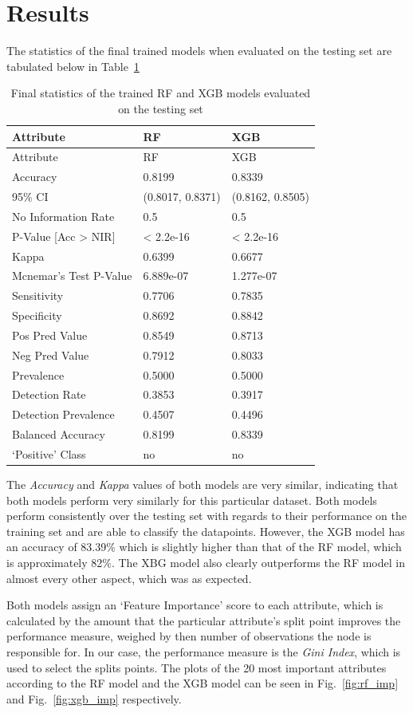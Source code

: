 \documentclass[runningheads]{llncs}
\begin{document}
\hypertarget{results}{%
\section{Results}\label{results}}

The statistics of the final trained models when evaluated on the testing
set are tabulated below in Table~\ref{tbl:model_stats}

\hypertarget{tbl:model_stats}{}
\begin{longtable}[]{@{}lll@{}}
\caption{\label{tbl:model_stats}Final statistics of the trained RF and
XGB models evaluated on the testing set}\tabularnewline
\toprule
Attribute & RF & XGB\tabularnewline
\midrule
\endfirsthead
\toprule
Attribute & RF & XGB\tabularnewline
\midrule
\endhead
Accuracy & 0.8199 & 0.8339\tabularnewline
95\% CI & (0.8017, 0.8371) & (0.8162, 0.8505)\tabularnewline
No Information Rate & 0.5 & 0.5\tabularnewline
P-Value {[}Acc \textgreater{} NIR{]} & \textless{} 2.2e-16 & \textless{}
2.2e-16\tabularnewline
Kappa & 0.6399 & 0.6677\tabularnewline
Mcnemar's Test P-Value & 6.889e-07 & 1.277e-07\tabularnewline
Sensitivity & 0.7706 & 0.7835\tabularnewline
Specificity & 0.8692 & 0.8842\tabularnewline
Pos Pred Value & 0.8549 & 0.8713\tabularnewline
Neg Pred Value & 0.7912 & 0.8033\tabularnewline
Prevalence & 0.5000 & 0.5000\tabularnewline
Detection Rate & 0.3853 & 0.3917\tabularnewline
Detection Prevalence & 0.4507 & 0.4496\tabularnewline
Balanced Accuracy & 0.8199 & 0.8339\tabularnewline
`Positive' Class & no & no\tabularnewline
\bottomrule
\end{longtable}

The \emph{Accuracy} and \emph{Kappa} values of both models are very
similar, indicating that both models perform very similarly for this
particular dataset. Both models perform consistently over the testing
set with regards to their performance on the training set and are able
to classify the datapoints. However, the XGB model has an accuracy of
83.39\% which is slightly higher than that of the RF model, which is
approximately 82\%. The XBG model also clearly outperforms the RF model
in almost every other aspect, which was as expected.

Both models assign an `Feature Importance' score to each attribute,
which is calculated by the amount that the particular attribute's split
point improves the performance measure, weighed by then number of
observations the node is responsible for. In our case, the performance
measure is the \emph{Gini Index}, which is used to select the splits
points. The plots of the 20 most important attributes according to the
RF model and the XGB model can be seen in Fig.~\ref{fig:rf_imp} and
Fig.~\ref{fig:xgb_imp} respectively.
\end{document}
